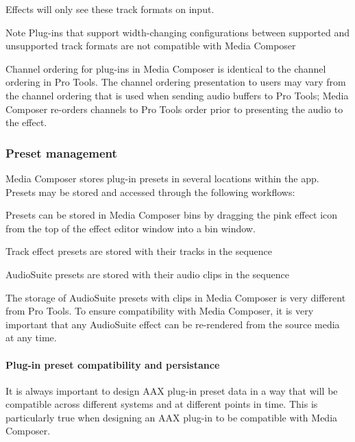 Effects will only see these track formats on input.

\begin{DoxyNote}{Note}
Plug-\/ins that support width-\/changing configurations between supported and unsupported track formats are not compatible with Media Composer
\end{DoxyNote}
Channel ordering for plug-\/ins in Media Composer is identical to the channel ordering in Pro Tools. The channel ordering presentation to users may vary from the channel ordering that is used when sending audio buffers to Pro Tools; Media Composer re-\/orders channels to Pro Tools order prior to presenting the audio to the effect.

\hypertarget{a00361_subsection__aax_media_composer_guide__features__presets}{}\subsubsection{Preset management}\label{a00361_subsection__aax_media_composer_guide__features__presets}
 Media Composer stores plug-\/in presets in several locations within the app. Presets may be stored and accessed through the following workflows\+: 
\begin{DoxyItemize}
\item Presets can be stored in Media Composer bins by dragging the pink effect icon from the top of the effect editor window into a bin window.  
\item Track effect presets are stored with their tracks in the sequence  
\item Audio\+Suite presets are stored with their audio clips in the sequence  
\end{DoxyItemize}

The storage of Audio\+Suite presets with clips in Media Composer is very different from Pro Tools. To ensure compatibility with Media Composer, it is very important that any Audio\+Suite effect can be re-\/rendered from the source media at any time.

\hypertarget{a00361_subsubsection__aax_media_composer_guide__features__presets__persistence_notes}{}\paragraph{Plug-\/in preset compatibility and persistance}\label{a00361_subsubsection__aax_media_composer_guide__features__presets__persistence_notes}
 It is always important to design A\+A\+X plug-\/in preset data in a way that will be compatible across different systems and at different points in time. This is particularly true when designing an A\+A\+X plug-\/in to be compatible with Media Composer.

